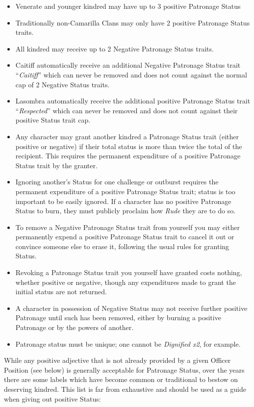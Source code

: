 \begin{itemize}
   \item Venerate and younger kindred may have up to 3 positive Patronage Status
   \item Traditionally non-Camarilla Clans may only have 2 positive Patronage Status traits.
   \item All kindred may receive up to 2 Negative Patronage Status traits.
   \item Caitiff automatically receive an additional Negative Patronage Status trait ``\emph{Caitiff}'' which can never be removed and does not count against the normal cap of 2 Negative Status traits.
   \item Lasombra automatically receive the additional positive Patronage Status trait ``\emph{Respected}'' which can never be removed and does not count against their positive Status trait cap.
   \item Any character may grant another kindred a Patronage Status trait (either positive or negative) if their total status is more than twice the total of the recipient. This requires the permanent expenditure of a positive Patronage Status trait by the granter. 
   \item Ignoring another's Status for one challenge or outburst requires the permanent expenditure of a positive Patronage Status trait; status is too important to be easily ignored.  If a character has no 
   positive Patronage Status to burn, they must publicly proclaim how \emph{Rude} they are to do so.
   \item To remove a Negative Patronage Status trait from yourself you may either permanently expend a positive Patronage Status trait to cancel it out or convince someone else to erase it, following the usual rules for granting Status.
   \item Revoking a Patronage Status trait you yourself have granted costs nothing, whether positive or 
   negative, though any expenditures made to grant the initial status are not returned.
   \item A character in possession of Negative Status may not receive further positive Patronage until such has been removed, either by burning a positive Patronage or by the powers of another.
   \item Patronage status must be unique; one cannot be \emph{Dignified x2}, for example.
\end{itemize}

\noindent While any positive adjective that is not already provided by a given Officer Position (see below) is generally 
acceptable for Patronage Status, over the years there are some labels which have become common or traditional 
to bestow on deserving kindred.  This list is far from exhaustive and should be used as a guide when giving out 
positive Status: \\

